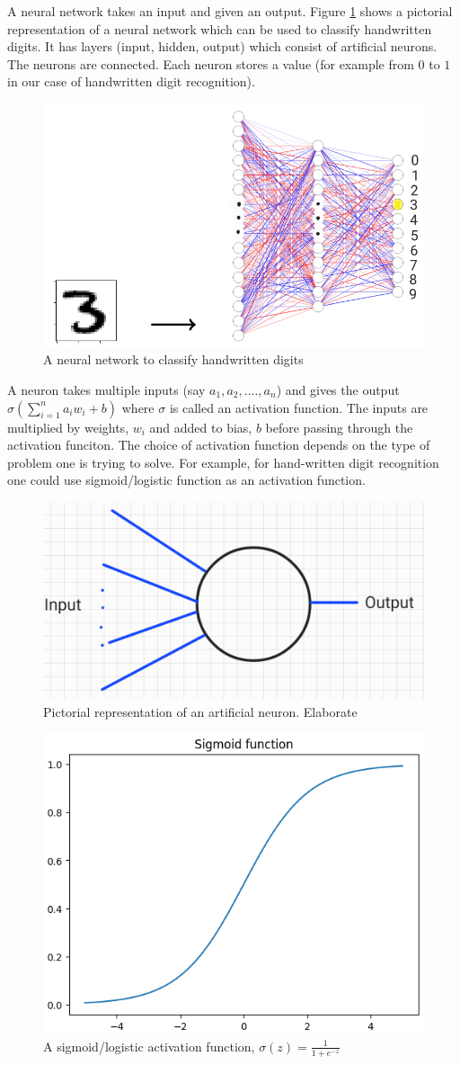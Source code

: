 A neural network takes an input and given an output. Figure \ref{fig:ff_net} shows a pictorial representation of
a neural network which can be used to classify handwritten digits. It has layers (input, hidden, output) which consist of 
artificial neurons. The neurons are connected. Each neuron stores a value (for example from $0$ to $1$ in 
our case of handwritten digit recognition). 
\begin{figure}[htbp]
    \centering
    \includegraphics[width=.8\textwidth]{Figures/ff_net.png}
    \caption{A neural network to classify handwritten digits}
    \label{fig:ff_net}
\end{figure} 
A neuron takes multiple inputs (say $a_1, a_2,....,a_n$) and gives the output $\sigma(\sum_{i =1}^n a_i w_i + b)$ where $\sigma$ is
called an activation function. The inputs are multiplied by weights, $w_i$ and added to bias, $b$ before passing through the activation funciton.
The choice of activation function depends on the type of problem one is trying to solve. For example, for hand-written digit recognition one could use sigmoid/logistic function
as an activation function. 
\begin{figure}[htbp]
    \centering
    \includegraphics[width=.4\textwidth]{Figures/neuron.png}
    \caption{Pictorial representation of an artificial neuron. Elaborate}
    \label{fig:neuron}
\end{figure} 
\begin{figure}[htbp]
    \centering
    \includegraphics[width=.4\textwidth]{Figures/sigmoid.png}
    \caption{A sigmoid/logistic activation function, $\sigma (z) = \frac{1}{1+ e^{-z}}$}
    \label{fig:sig}
\end{figure} 

